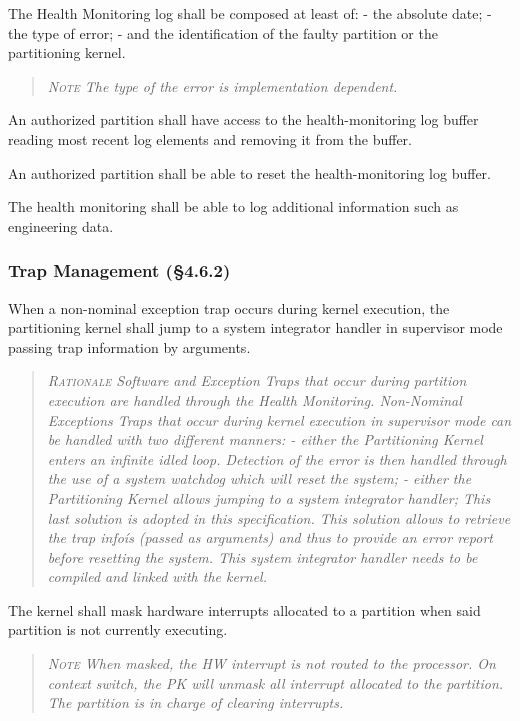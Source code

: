 The Health Monitoring log shall be composed at least of:
- the absolute date;
- the type of error;
- and the identification of the faulty partition or the partitioning kernel.
\begin{quote}\it
\textsc{Note}
The type of the error is implementation dependent.
\end{quote}

An authorized partition shall have access to the health-monitoring log buffer reading most recent log elements and removing it from the buffer.

An authorized partition shall be able to reset the health-monitoring log buffer.

The health monitoring shall be able to log additional information such as engineering data.

\subsubsection{Trap Management (\S4.6.2)}

When a non-nominal exception trap occurs during kernel execution, the partitioning kernel shall jump to a system integrator handler in supervisor mode passing trap information by arguments.
\begin{quote}\it
\textsc{Rationale}
Software and Exception Traps that occur during partition execution are handled through the Health Monitoring. Non-Nominal Exceptions Traps that occur during kernel execution in supervisor mode can be handled with two different manners:
- either the Partitioning Kernel enters an infinite idled loop. Detection of the error is then handled through the use of a system watchdog which will reset the system;
- either the Partitioning Kernel allows jumping to a system integrator handler;
This last solution is adopted in this specification. This solution allows to retrieve the trap infoís (passed as arguments) and thus to provide an error report before resetting the system.  This system integrator handler needs to be compiled and linked with the kernel.
\end{quote}

The kernel shall mask hardware interrupts allocated to a partition when said partition is not currently executing.
\begin{quote}\it
\textsc{Note}
When masked, the HW interrupt is not routed to the processor. On context switch, the PK will unmask all interrupt allocated to the partition. The partition is in charge of clearing interrupts.
\end{quote}

